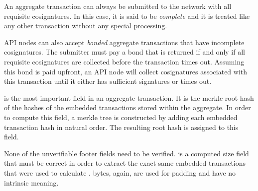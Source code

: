 An aggregate transaction can always be submitted to the network with all requisite cosignatures.
In this case, it is said to be \emph{complete} and it is treated like any other transaction without any special processing.

API nodes can also accept \emph{bonded} aggregate transactions that have incomplete cosignatures.
The submitter must pay a bond that is returned if and only if all requisite cosignatures are collected before the transaction times out.
Assuming this bond is paid upfront, an API node will collect cosignatures associated with this transaction until it either has sufficient signatures or times out.

 is the most important field in an aggregate transaction.
It is the merkle root hash of the hashes of the embedded transactions stored within the aggregate.
In order to compute this field, a merkle tree is constructed by adding each embedded transaction hash in natural order.
The resulting root hash is assigned to this field.

None of the unverifiable footer fields need to be verified.
 is a computed size field that must be correct in order to extract the exact same embedded transactions that were used to calculate .
 bytes, again, are used for padding and have no intrinsic meaning.

